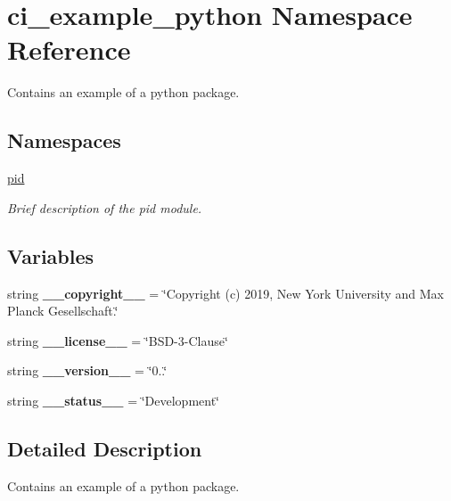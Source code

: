 \hypertarget{namespaceci__example__python}{}\section{ci\+\_\+example\+\_\+python Namespace Reference}
\label{namespaceci__example__python}


Contains an example of a python package.  


\subsection*{Namespaces}
\begin{DoxyCompactItemize}
\item 
 \hyperlink{namespaceci__example__python_1_1pid}{pid}
\begin{DoxyCompactList}\small\item\em Brief description of the pid module. \end{DoxyCompactList}\end{DoxyCompactItemize}
\subsection*{Variables}
\begin{DoxyCompactItemize}
\item 
\mbox{\label{namespaceci__example__python_aab65caa2bef4920bcaef5b13af27fbe4}} 
string {\bfseries \+\_\+\+\_\+copyright\+\_\+\+\_\+} = \char`\"{}Copyright (c) 2019, New York University and Max Planck Gesellschaft.\char`\"{}
\item 
\mbox{\label{namespaceci__example__python_ad69109fe33065870d54fb2fbcceadf8d}} 
string {\bfseries \+\_\+\+\_\+license\+\_\+\+\_\+} = \char`\"{}B\+SD-\/3-\/Clause\char`\"{}
\item 
\mbox{\label{namespaceci__example__python_af97923d3f3c14f3d9ca8a4e27122e302}} 
string {\bfseries \+\_\+\+\_\+version\+\_\+\+\_\+} = \char`\"{}0..\char`\"{}
\item 
\mbox{\label{namespaceci__example__python_abe23ebc6a414e4a9b373eb091e98a43b}} 
string {\bfseries \+\_\+\+\_\+status\+\_\+\+\_\+} = \char`\"{}Development\char`\"{}
\end{DoxyCompactItemize}


\subsection{Detailed Description}
Contains an example of a python package. 